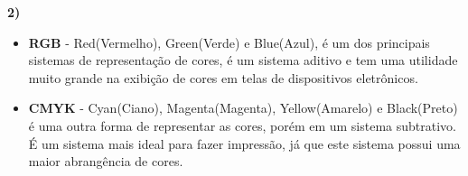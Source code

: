 \textbf{2)} 

\begin{itemize}
	\item \textbf{RGB} - Red(Vermelho), Green(Verde) e Blue(Azul), é um dos principais sistemas 
	de representação de cores, é um sistema aditivo e tem uma utilidade muito grande na
	exibição de cores em telas de dispositivos eletrônicos.
	\item \textbf{CMYK} - Cyan(Ciano), Magenta(Magenta), Yellow(Amarelo) e Black(Preto) é uma outra 
	forma de representar as cores, porém em um sistema subtrativo. É um sistema mais ideal
	para fazer impressão, já que este sistema possui uma maior abrangência de cores.
\end{itemize}
